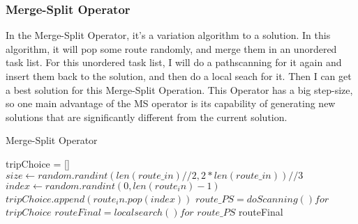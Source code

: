 \documentclass[conference,compsoc]{IEEEtran}
\begin{document}
    \subsubsection{Merge-Split Operator}
      In the Merge-Split Operator, it's a variation algorithm to a solution. In this algorithm, it will pop some route randomly, and merge them in an unordered task list.
      For this unordered task list, I will do a pathscanning for it again and insert them back to the solution, and then do a local seach for it. Then I can get a best solution for this Merge-Split Operation.
      This Operator has a big step-size, so one main advantage of the MS operator is its capability of generating new solutions that are significantly different from the current solution.  
      \begin{algorithm}
        \caption{Merge-Split Operator}
        \begin{algorithmic}[1]
            \State tripChoice = []
            \State $size \gets random.randint(len(route\_in)//2,2*len(route\_in))//3$
              \State $index\gets random.randint(0, len(route_in)-1)$
              \State $tripChoice.append(route_in.pop(index))$
            \EndFor
            \State $route\_PS = doScanning()for$ $tripChoice$
            \State $routeFinal = localsearch()for$ $route\_PS$
            \State \Return routeFinal
          \EndFunction
        \end{algorithmic}
      \end{algorithm}
\end{document}
